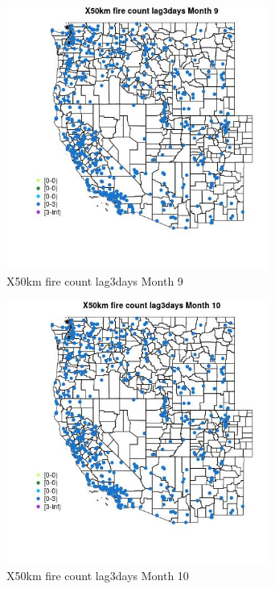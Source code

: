 \begin{figure} 
\centering  
\includegraphics[width=0.77\textwidth]{Code_Outputs/Report_ML_input_PM25_Step4_part_e_de_duplicated_aves_compiled_2019-05-14wNAs_MapObsMo9X50km_fire_count_lag3days.jpg} 
\caption{\label{fig:Report_ML_input_PM25_Step4_part_e_de_duplicated_aves_compiled_2019-05-14wNAsMapObsMo9X50km_fire_count_lag3days}X50km fire count lag3days Month 9} 
\end{figure} 
 

\clearpage 

\begin{figure} 
\centering  
\includegraphics[width=0.77\textwidth]{Code_Outputs/Report_ML_input_PM25_Step4_part_e_de_duplicated_aves_compiled_2019-05-14wNAs_MapObsMo10X50km_fire_count_lag3days.jpg} 
\caption{\label{fig:Report_ML_input_PM25_Step4_part_e_de_duplicated_aves_compiled_2019-05-14wNAsMapObsMo10X50km_fire_count_lag3days}X50km fire count lag3days Month 10} 
\end{figure} 
 

